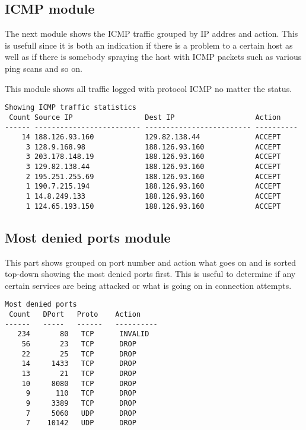 \documentclass[english,twoside,openright,a4paper,12pt]{article}
\begin{document}
\subsection{ICMP module}

The next module shows the ICMP traffic grouped by IP addres and
action. This is usefull since it is both an indication if there is a
problem to a certain host as well as if there is somebody spraying the
host with ICMP packets such as various ping scans and so on.

This module shows all traffic logged with protocol ICMP no matter the
status.

\scriptsize \begin{verbatim}
Showing ICMP traffic statistics
 Count Source IP                 Dest IP                   Action    
------ ------------------------- ------------------------- ----------
    14 188.126.93.160            129.82.138.44             ACCEPT    
     3 128.9.168.98              188.126.93.160            ACCEPT    
     3 203.178.148.19            188.126.93.160            ACCEPT    
     3 129.82.138.44             188.126.93.160            ACCEPT    
     2 195.251.255.69            188.126.93.160            ACCEPT    
     1 190.7.215.194             188.126.93.160            ACCEPT    
     1 14.8.249.133              188.126.93.160            ACCEPT    
     1 124.65.193.150            188.126.93.160            ACCEPT    
\end{verbatim} \normalsize

\subsection{Most denied ports module}

This part shows grouped on port number and action what goes on and is
sorted top-down showing the most denied ports first. This is useful to
determine if any certain services are being attacked or what is going
on in connection attempts.

\scriptsize \begin{verbatim}
Most denied ports
 Count   DPort   Proto    Action       
------   -----   ------   ----------   
   234       80   TCP      INVALID   
    56       23   TCP      DROP      
    22       25   TCP      DROP      
    14     1433   TCP      DROP      
    13       21   TCP      DROP      
    10     8080   TCP      DROP      
     9      110   TCP      DROP      
     9     3389   TCP      DROP      
     7     5060   UDP      DROP      
     7    10142   UDP      DROP      
\end{verbatim} \normalsize
\end{document}
